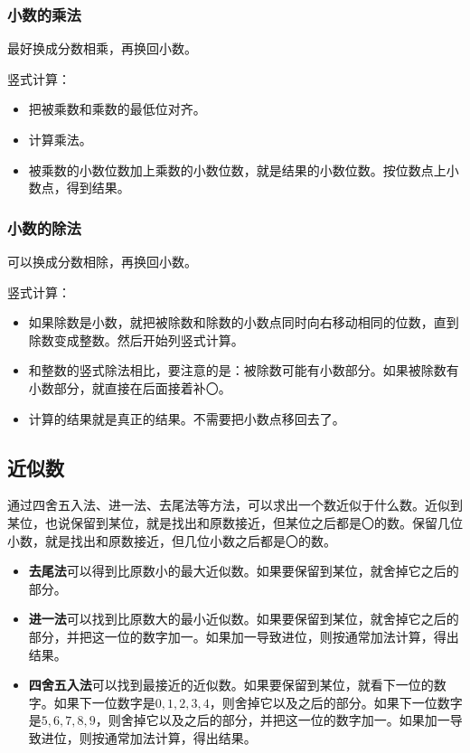 \documentclass[12pt,UTF8]{ctexart}
\begin{document}
\subsubsection{小数的乘法}

最好换成分数相乘，再换回小数。

竖式计算：

\begin{itemize}
\item 把被乘数和乘数的最低位对齐。
\item 计算乘法。
\item 被乘数的小数位数加上乘数的小数位数，就是结果的小数位数。按位数点上小数点，得到结果。
\end{itemize}

\subsubsection{小数的除法}

可以换成分数相除，再换回小数。

竖式计算：

\begin{itemize}
\item 如果除数是小数，就把被除数和除数的小数点同时向右移动相同的位数，直到除数变成整数。然后开始列竖式计算。
\item 和整数的竖式除法相比，要注意的是：被除数可能有小数部分。如果被除数有小数部分，就直接在后面接着补〇。
\item 计算的结果就是真正的结果。不需要把小数点移回去了。
\end{itemize}

\subsection{近似数}

通过四舍五入法、进一法、去尾法等方法，可以求出一个数近似于什么数。近似到某位，也说保留到某位，就是找出和原数接近，但某位之后都是〇的数。保留几位小数，就是找出和原数接近，但几位小数之后都是〇的数。

\begin{itemize}
    \item \textbf{去尾法}可以得到比原数小的最大近似数。如果要保留到某位，就舍掉它之后的部分。
    \item \textbf{进一法}可以找到比原数大的最小近似数。如果要保留到某位，就舍掉它之后的部分，并把这一位的数字加一。如果加一导致进位，则按通常加法计算，得出结果。
    \item \textbf{四舍五入法}可以找到最接近的近似数。如果要保留到某位，就看下一位的数字。如果下一位数字是$0,1,2,3,4$，则舍掉它以及之后的部分。如果下一位数字是$5,6,7,8,9$，则舍掉它以及之后的部分，并把这一位的数字加一。如果加一导致进位，则按通常加法计算，得出结果。
\end{itemize}
\end{document}
